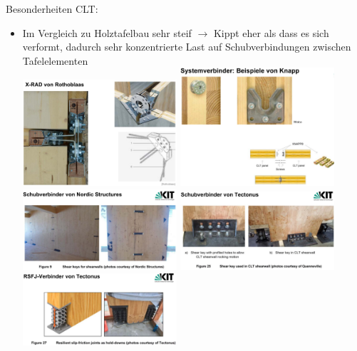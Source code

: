 \documentclass[fleqn,twoside]{article}
\begin{document}
Besonderheiten CLT:
    \begin{itemize}
        \item Im Vergleich zu Holztafelbau sehr steif $\rightarrow$ Kippt eher als dass es sich verformt, dadurch sehr konzentrierte Last auf Schubverbindungen zwischen Tafelelementen\\
        \includegraphics[width=0.45\textwidth]{Grafiken/CLT-Verbindungen/X-RAD Rothoblaas.png}
        \includegraphics[width=0.45\textwidth]{Grafiken/CLT-Verbindungen/Knapp Systemverbinder.png}\\
        \includegraphics[width=0.45\textwidth]{Grafiken/CLT-Verbindungen/Nordic Structures Schubverbinder.png}
        \includegraphics[width=0.45\textwidth]{Grafiken/CLT-Verbindungen/Tectonus Schubverbinder.png}\\
        \includegraphics[width=0.45\textwidth]{Grafiken/CLT-Verbindungen/Tectonus RSFJ.png}\\

\end{itemize}
\end{document}
